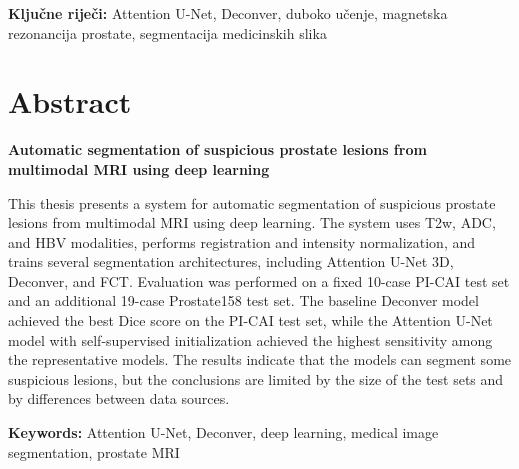 \documentclass[a4paper,12pt,oneside]{article}
\let\sectionwithoutpagebreak\section
\renewcommand{\section}{\clearpage\sectionwithoutpagebreak}%
\begin{document}
\bigskip
\noindent\textbf{Ključne riječi:} Attention U-Net, Deconver, duboko učenje, magnetska rezonancija prostate, segmentacija medicinskih slika

\newpage
\section*{Abstract}

\noindent\textbf{Automatic segmentation of suspicious prostate lesions from multimodal MRI using deep learning}

This thesis presents a system for automatic segmentation of suspicious prostate lesions from multimodal MRI using deep learning. The system uses T2w, ADC, and HBV modalities, performs registration and intensity normalization, and trains several segmentation architectures, including Attention U-Net 3D, Deconver, and FCT. Evaluation was performed on a fixed 10-case PI-CAI test set and an additional 19-case Prostate158 test set. The baseline Deconver model achieved the best Dice score on the PI-CAI test set, while the Attention U-Net model with self-supervised initialization achieved the highest sensitivity among the representative models. The results indicate that the models can segment some suspicious lesions, but the conclusions are limited by the size of the test sets and by differences between data sources.

\bigskip
\noindent\textbf{Keywords:} Attention U-Net, Deconver, deep learning, medical image segmentation, prostate MRI
\end{document}
